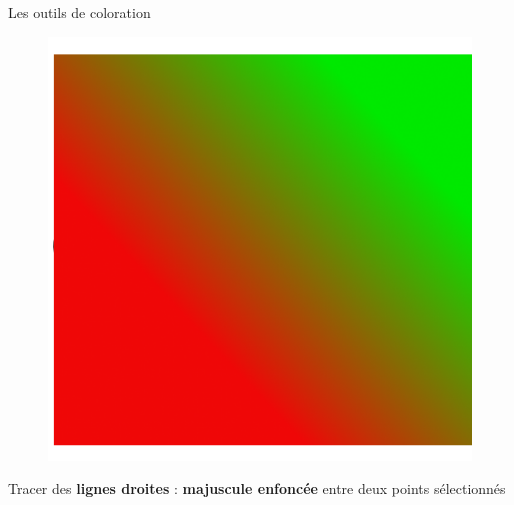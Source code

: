 \documentclass[10pt,svgnames,usenames,table]{beamer}
\begin{document}
\begin{frame}[allowframebreaks]{Les outils de coloration}
\begin{itemize}
\begin{minipage}{0.45\textwidth}
\begin{figure}
        	\includegraphics[width=\textwidth]{Images/degrade_ex2.png} 
	\end{figure}
	\end{minipage}
	
	
	Tracer des \textbf{lignes droites} : \textbf{majuscule enfoncée} entre deux points sélectionnés
	\end{itemize}
\end{frame}


\end{document}
